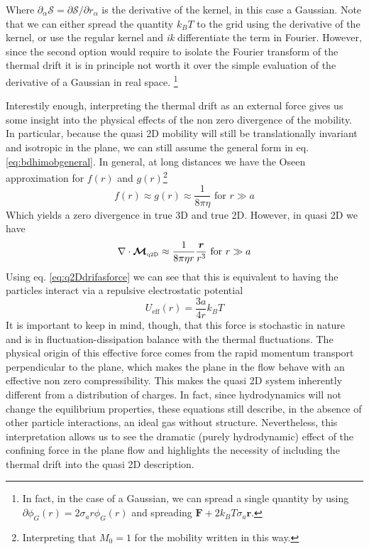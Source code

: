 \documentclass[ twoside,openright,titlepage,numbers=noenddot,%
headinclude,footinclude,cleardoublepage=empty,abstract=on,
BCOR=5mm,paper=a4,fontsize=11pt, dvipsnames
]{scrreprt}
\renewcommand{\vec}[1]{\bm{#1}}
\newcommand{\tens}[1]{\bm{\mathcal{#1}}}
\newcommand{\oper}[1]{\mathcal{#1}}
\newcommand{\kT}{k_B T}
\newcommand{\qtd}{\text{\tiny q2D}}
\begin{document}
Where $\partial_\alpha\oper{S} = \partial\oper{S}/\partial r_\alpha$ is the derivative of the kernel, in this case a Gaussian. Note that we can either spread the quantity $\kT$ to the grid using the derivative of the kernel, or use the regular kernel and \emph{ik} differentiate the term in Fourier. However, since the second option would require to isolate the Fourier transform of the thermal drift it is in principle not worth it over the simple evaluation of the derivative of a Gaussian in real space.
\footnote{In fact, in the case of a Gaussian, we can spread a single quantity by using $\partial\phi_G(r) = 2\sigma_ar\phi_G(r)$ and spreading $\vec{F} + 2\kT\sigma_a\vec{r}$.}

Interestily enough, interpreting the thermal drift as an external force gives us some insight into the physical effects of the non zero divergence of the mobility. In particular, because the quasi 2D mobility will still be translationally invariant and isotropic in the plane, we can still assume the general form in eq. \eqref{eq:bdhimobgeneral}. In general, at long distances we have the Oseen approximation for $f(r)$ and $g(r)$\footnote{Interpreting that $M_0=1$ for the mobility written in this way.}
\begin{equation}
  f(r) \approx g(r) \approx \frac{1}{8\pi\eta} \text{ for } r\gg a
\end{equation}
Which yields a zero divergence in true 3D and true 2D. However, in quasi 2D we have
\begin{equation}
  \nabla\cdot\tens{M}_{\qtd} \approx \frac{1}{8\pi\eta r}\frac{\vec{r}}{r^3} \text{ for } r\gg a
\end{equation}
Using eq. \eqref{eq:q2Ddrifasforce} we can see that this is equivalent to having the particles interact via a repulsive electrostatic potential
\begin{equation}
  \label{eq:q2Deffrepulsion}
  U_{\text{eff}}(r) = \frac{3a}{4r}\kT
\end{equation}
It is important to keep in mind, though, that this force is stochastic in nature and is in fluctuation-dissipation balance with the thermal fluctuations. The physical origin of this effective force comes from the rapid momentum transport perpendicular to the plane, which makes the plane in the flow behave with an effective non zero compressibility. This makes the quasi 2D system inherently different from a distribution of charges. In fact, since hydrodynamics will not change the equilibrium properties, these equations still describe, in the absence of other particle interactions, an ideal gas without structure. Nevertheless, this interpretation allows us to see the dramatic (purely hydrodynamic) effect of the confining force in the plane flow and highlights the necessity of including the thermal drift into the quasi 2D description.
\end{document}
